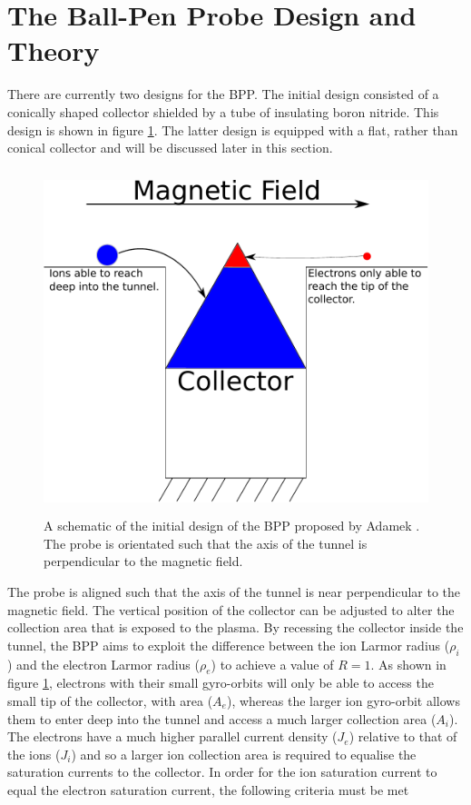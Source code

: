 \section{The Ball-Pen Probe Design and Theory}
There are currently two designs for the BPP. The initial design \cite{BPP} consisted of a conically shaped collector shielded by a tube of insulating boron nitride. This design is shown in figure \ref{fig:BPP_Adamek}. The latter design is equipped with  a flat, rather than conical collector and will be discussed later in this section.
\begin{figure}[H]
\centering
\includegraphics[height=10cm]{adamek_probe.pdf}
\caption{A schematic of the initial design of the BPP proposed by Adamek \cite{BPP}. The probe is orientated such that the axis of the tunnel is perpendicular to the magnetic field.}
\label{fig:BPP_Adamek}
\end{figure}
The probe is aligned such that the axis of the tunnel is near perpendicular to the magnetic field. The vertical position of the collector can be adjusted to alter the collection area that is exposed to the plasma. By recessing the collector inside the tunnel, the BPP aims to exploit the difference between the ion Larmor radius ($\rho_i$) and the electron Larmor radius ($\rho_e$) to achieve a value of $R=1$. As shown in figure \ref{fig:BPP_Adamek}, electrons with their small gyro-orbits will only be able to access the small tip of the collector, with area ($A_e$), whereas the larger ion gyro-orbit allows them to enter deep into the tunnel and access a much larger collection area ($A_i$). The electrons have a much higher parallel current density ($J_e$) relative to that of the ions ($J_i$) and so a larger ion collection area is required to equalise the saturation currents to the collector. In order for the ion saturation current to equal the electron saturation current, the following criteria must be met 
